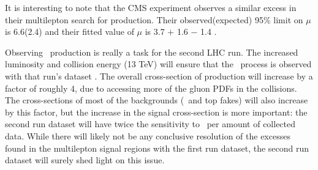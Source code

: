 It is interesting to note that the CMS experiment observes a similar excess in their multilepton search
for \tth production. Their observed(expected) 95\% limit on $\mu$ is 6.6(2.4) and their fitted value of $\mu$
is 3.7 $+$ 1.6 $-$ 1.4 \cite{CMS-PAS-HIG-13-020}.

Observing \tth\ production is really a task for the second LHC run. The increased luminosity and collision
energy (13 TeV) will ensure that the \tth\ process is observed with that run's dataset \cite{Dawson:2013bba}. The
overall cross-section of \tth production will increase by a factor of roughly 4, due to accessing
more of the gluon PDFs in the collisions. The cross-sections of most of the backgrounds (\ttV\ and top fakes) will also increase by this factor,
but the increase in the signal cross-section is more important: the second run dataset will have
twice the sensitivity to \tth\ per amount of collected data. While
there will likely not be any conclusive resolution of the excesses found in the multilepton signal regions
with the first run dataset, the second run dataset will surely shed light on this issue.  

